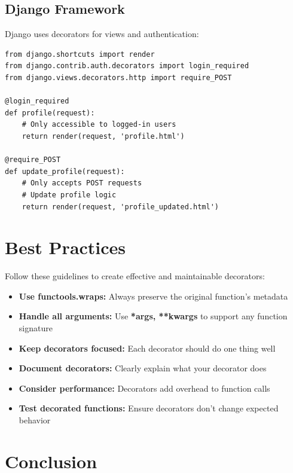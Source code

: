\documentclass[12pt,letterpaper]{article}
\newenvironment{macterminal}{%
    \begin{mdframed}[
        linecolor=terminalFrame,
        backgroundcolor=terminalBg,
        roundcorner=5pt,
        skipabove=10pt,
        skipbelow=10pt,
        linewidth=1pt,
        innertopmargin=10pt, %
        frametitle={%
            \tikz[baseline=(current bounding box.east), outer sep=0pt]{
                \fill[red!80!black] (0,0) circle (5pt);
                \fill[yellow!80!black] (0.7,0) circle (5pt);
                \fill[green!70!black] (1.4,0) circle (5pt);
            }
        },
        frametitlealignment=\raggedright, %
        frametitleaboveskip=8pt, %
        frametitlebelowskip=0pt, %
    ]
}{%
    \end{mdframed}%
}
\begin{document}
\subsection{Django Framework}

Django uses decorators for views and authentication:

\begin{macterminal}
\begin{lstlisting}
from django.shortcuts import render
from django.contrib.auth.decorators import login_required
from django.views.decorators.http import require_POST

@login_required
def profile(request):
    # Only accessible to logged-in users
    return render(request, 'profile.html')

@require_POST
def update_profile(request):
    # Only accepts POST requests
    # Update profile logic
    return render(request, 'profile_updated.html')
\end{lstlisting}
\end{macterminal}

\section{Best Practices}

Follow these guidelines to create effective and maintainable decorators:

\begin{itemize}
    \item \textbf{\textcolor{pythonBlue}{Use functools.wraps:}} Always preserve the original function's metadata
    \item \textbf{\textcolor{pythonBlue}{Handle all arguments:}} Use \textbf{\textcolor{accentColor}{*args, **kwargs}} to support any function signature
    \item \textbf{\textcolor{pythonBlue}{Keep decorators focused:}} Each decorator should do one thing well
    \item \textbf{\textcolor{pythonBlue}{Document decorators:}} Clearly explain what your decorator does
    \item \textbf{\textcolor{pythonBlue}{Consider performance:}} Decorators add overhead to function calls
    \item \textbf{\textcolor{pythonBlue}{Test decorated functions:}} Ensure decorators don't change expected behavior
\end{itemize}

\section{Conclusion}
\end{document}
